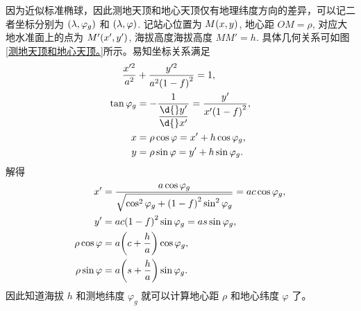 \documentclass[UTF8, 12pt, a4paper, oneside, onecolumn, fontset=none]{ctexart}
\begin{document}
因为近似标准椭球，因此测地天顶和地心天顶仅有地理纬度方向的差异，可以记二者坐标分别为 $\mleft(\lambda,\varphi_{g}\mright)$ 和 $\mleft(\lambda,\varphi\mright)$. 记站心位置为 $M\mleft(x, y\mright)$, 地心距 $OM=\rho$, 对应大地水准面上的点为 $M'\mleft(x', y'\mright)$, 海拔高度海拔高度 $MM'=h$. 具体几何关系可如图\ref{测地天顶和地心天顶。}所示。易知坐标关系满足
\begin{align}
\frac{x'^{2}}{a^{2}}&+\frac{y'^{2}}{a^{2}\mleft(1-f\mright)^{2}}=1,\\
\tan{\varphi_{g}}&=-\dfrac{1}{\dfrac{\d{}y'}{\d{}x'}}=\frac{y'}{x'\mleft(1-f\mright)^{2}},\\
x&=\rho\cos{\varphi}=x'+h\cos{\varphi_{g}},\\
y&=\rho\sin{\varphi}=y'+h\sin{\varphi_{g}}.
\end{align}
解得
\begin{align}
x'&=\frac{a\cos{\varphi_{g}}}{\sqrt{\cos^{2}{\varphi_{g}}+\mleft(1-f\mright)^{2}\sin^{2}{\varphi_{g}}}}=ac\cos{\varphi_{g}},\\
y'&=ac\mleft(1-f\mright)^{2}\sin{\varphi_{g}}=as\sin{\varphi_{g}},\\
\rho\cos{\varphi}&=a\mleft(c+\frac{h}{a}\mright)\cos{\varphi_{g}},\\
\rho\sin{\varphi}&=a\mleft(s+\frac{h}{a}\mright)\sin{\varphi_{g}}.
\end{align}
因此知道海拔 $h$ 和测地纬度 $\varphi_{g}$ 就可以计算地心距 $\rho$ 和地心纬度 $\varphi$ 了。
\end{document}
